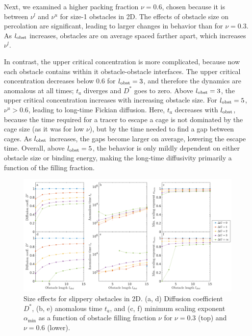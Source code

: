 Next, we examined a higher packing fraction $\nu = 0.6$, chosen because it is
between $\nu^l$ and $\nu^u$ for size-1 obstacles in 2D. The effects of obstacle
size on percolation are significant, leading to larger changes in behavior than
for $\nu=0.3$.  As $l_{\rm obst}$ increases, obstacles are on average spaced
farther apart, which increases $\nu^l$.

In contrast, the upper critical concentration is more complicated, because now
each obstacle contains within it obstacle-obstacle interfaces.  The upper
critical concentration decreases below $0.6$ for $l_{\rm obst} = 3$, and
therefore the dynamics are anomalous at all times; $t_a$ diverges and $D^*$ goes
to zero.  Above $l_{\rm obst} = 3$, the upper critical concentration increases
with increasing obstacle size.  For $l_{\rm obst} = 5$, $\nu^u>0.6$, leading to
long-time Fickian diffusion.  Here, $t_a$ decreases with $l_{\rm obst}$, because
the time required for a tracer to escape a cage is not dominated by the cage
size (as it was for low $\nu$), but by the time needed to find a gap between
cages.  As $l_{\rm obst}$ increases, the gaps become larger on average, lowering
the escape time.  Overall, above $l_{\rm obst} = 5$, the behavior is only mildly
dependent on either obstacle size or binding energy, making the long-time
diffusivity primarily a function of the filling fraction.

\begin{figure}[!hb]
  \begin{center}
	  \includegraphics[width=150mm]{figs/ch02_soft/soft_size_slippery.png}
  \end{center}
	\caption[Slippery size effects]
    {Size effects for slippery obstacles in 2D.  (a, d)
    Diffusion coefficient $D^*$, (b, e) anomalous time $ t_a $, and
    (c, f) minimum scaling exponent $\alpha_{\min}$ as a function
    of obstacle filling fraction $\nu$ for $\nu=0.3$ (top) and
    $\nu =0.6$ (lower).}\label{fig:size_slippery}
\end{figure}

